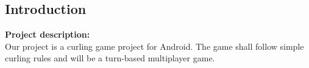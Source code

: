 \subsection{Introduction}

\textbf{Project description:} \\ 
Our project is a curling game project for Android. The game shall follow simple curling rules and will be a turn-based multiplayer game.\\